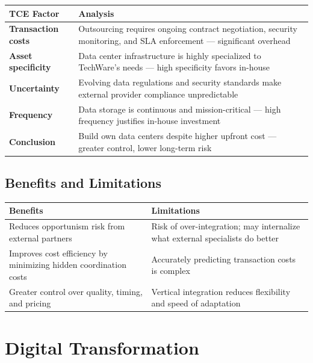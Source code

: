 \documentclass[11pt, letterpaper]{article}
\begin{document}
\begin{center}
\begin{tabular}{>{\bfseries}p{3cm} p{10cm}}
\toprule
TCE Factor & Analysis \\
\midrule
Transaction costs & Outsourcing requires ongoing contract negotiation, security monitoring, and SLA enforcement --- significant overhead \\
Asset specificity & Data center infrastructure is highly specialized to TechWare's needs --- high specificity favors in-house \\
Uncertainty & Evolving data regulations and security standards make external provider compliance unpredictable \\
Frequency & Data storage is continuous and mission-critical --- high frequency justifies in-house investment \\
\midrule
\textbf{Conclusion} & Build own data centers despite higher upfront cost --- greater control, lower long-term risk \\
\bottomrule
\end{tabular}
\end{center}

\subsection{Benefits and Limitations}

\begin{center}
\begin{tabular}{p{6.5cm} p{6.5cm}}
\toprule
\textbf{Benefits} & \textbf{Limitations} \\
\midrule
Reduces opportunism risk from external partners & Risk of over-integration; may internalize what external specialists do better \\
Improves cost efficiency by minimizing hidden coordination costs & Accurately predicting transaction costs is complex \\
Greater control over quality, timing, and pricing & Vertical integration reduces flexibility and speed of adaptation \\
\bottomrule
\end{tabular}
\end{center}

\newpage

\section{Digital Transformation}
\end{document}
